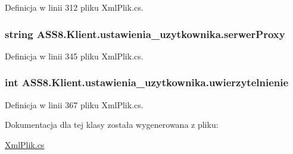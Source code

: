 Definicja w linii 312 pliku XmlPlik.cs.\hypertarget{a00029_8a03c32e5d015f5378462ccc9b231c78}{
\subsubsection[{serwerProxy}]{\setlength{\rightskip}{0pt plus 5cm}string ASS8.Klient.ustawienia\_\-uzytkownika.serwerProxy}}
\label{d5/d16/a00029_8a03c32e5d015f5378462ccc9b231c78}




Definicja w linii 345 pliku XmlPlik.cs.\hypertarget{a00029_21b09b5678e359c516ac5d1da7e789c2}{
\subsubsection[{uwierzytelnienie}]{\setlength{\rightskip}{0pt plus 5cm}int ASS8.Klient.ustawienia\_\-uzytkownika.uwierzytelnienie}}
\label{d5/d16/a00029_21b09b5678e359c516ac5d1da7e789c2}




Definicja w linii 367 pliku XmlPlik.cs.

Dokumentacja dla tej klasy została wygenerowana z pliku:\begin{CompactItemize}
\item 
\hyperlink{a00054}{XmlPlik.cs}\end{CompactItemize}
